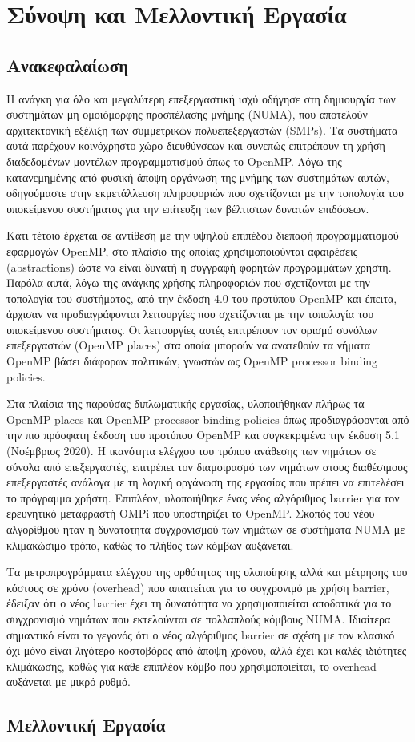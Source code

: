 \chapter{Σύνοψη και Μελλοντική Εργασία}

\section{Ανακεφαλαίωση}
Η ανάγκη για όλο και μεγαλύτερη επεξεργαστική ισχύ οδήγησε στη δημιουργία των συστημάτων μη ομοιόμορφης προσπέλασης μνήμης (NUMA), που αποτελούν αρχιτεκτονική εξέλιξη των συμμετρικών πολυεπεξεργαστών (SMPs). Τα συστήματα αυτά παρέχουν κοινόχρηστο χώρο διευθύνσεων και συνεπώς επιτρέπουν τη χρήση διαδεδομένων μοντέλων προγραμματισμού όπως το OpenMP. Λόγω της κατανεμημένης από φυσική άποψη οργάνωση της μνήμης των συστημάτων αυτών, οδηγούμαστε στην εκμετάλλευση πληροφοριών που σχετίζονται με την τοπολογία του υποκείμενου συστήματος για την επίτευξη των βέλτιστων δυνατών επιδόσεων.

Κάτι τέτοιο έρχεται σε αντίθεση με την υψηλού επιπέδου διεπαφή προγραμματισμού εφαρμογών OpenMP, στο πλαίσιο της οποίας χρησιμοποιούνται αφαιρέσεις (abstractions) ώστε να είναι δυνατή η συγγραφή φορητών προγραμμάτων χρήστη. Παρόλα αυτά, λόγω της ανάγκης χρήσης πληροφοριών που σχετίζονται με την τοπολογία του συστήματος, από την έκδοση 4.0 του προτύπου OpenMP και έπειτα, άρχισαν να προδιαγράφονται λειτουργίες που σχετίζονται με την τοπολογία του υποκείμενου συστήματος. Οι λειτουργίες αυτές επιτρέπουν τον ορισμό συνόλων επεξεργαστών (OpenMP places) στα οποία μπορούν να ανατεθούν τα νήματα OpenMP βάσει διάφορων πολιτικών, γνωστών ως OpenMP processor binding policies.

Στα πλαίσια της παρούσας διπλωματικής εργασίας, υλοποιήθηκαν πλήρως τα OpenMP places και OpenMP processor binding policies όπως προδιαγράφονται από την πιο πρόσφατη έκδοση του προτύπου OpenMP και συγκεκριμένα την έκδοση 5.1 (Νοέμβριος 2020). Η ικανότητα ελέγχου του τρόπου ανάθεσης των νημάτων σε σύνολα από επεξεργαστές, επιτρέπει τον διαμοιρασμό των νημάτων στους διαθέσιμους επεξεργαστές ανάλογα με τη λογική οργάνωση της εργασίας που πρέπει να επιτελέσει το πρόγραμμα χρήστη. Επιπλέον, υλοποιήθηκε ένας νέος αλγόριθμος barrier για τον ερευνητικό μεταφραστή OMPi που υποστηρίζει το OpenMP. Σκοπός του νέου αλγορίθμου ήταν η δυνατότητα συγχρονισμού των νημάτων σε συστήματα NUMA με κλιμακώσιμο τρόπο, καθώς το πλήθος των κόμβων αυξάνεται.

Τα μετροπρογράμματα ελέγχου της ορθότητας της υλοποίησης αλλά και μέτρησης του κόστους σε χρόνο (overhead) που απαιτείται για το συγχρονιμό με χρήση barrier, έδειξαν ότι ο νέος barrier έχει τη δυνατότητα να χρησιμοποιείται αποδοτικά για το συγχρονισμό νημάτων που εκτελούνται σε πολλαπλούς κόμβους NUMA. Ιδιαίτερα σημαντικό είναι το γεγονός ότι ο νέος αλγόριθμος barrier σε σχέση με τον κλασικό όχι μόνο είναι λιγότερο κοστοβόρος από άποψη χρόνου, αλλά έχει και καλές ιδιότητες κλιμάκωσης, καθώς για κάθε επιπλέον κόμβο που χρησιμοποιείται, το overhead αυξάνεται με μικρό ρυθμό.


\section{Μελλοντική Εργασία}
